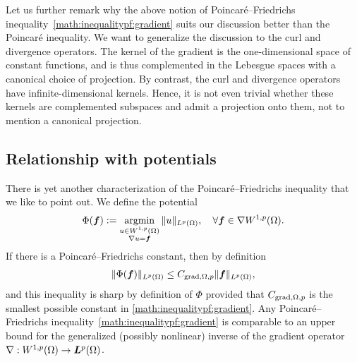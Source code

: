 \documentclass[10pt,a4paper]{article}
\begin{document}
\begin{remark}
    Let us further remark why the above notion of Poincar\'e--Friedrichs inequality~\eqref{math:inequalitypf:gradient} suits our discussion better than the Poincar\'e inequality. 
    We want to generalize the discussion to the curl and divergence operators. 
    The kernel of the gradient is the one-dimensional space of constant functions, and is thus complemented in the Lebesgue spaces with a canonical choice of projection. 
    By contrast, the curl and divergence operators have infinite-dimensional kernels. 
    Hence, it is not even trivial whether these kernels are complemented subspaces and admit a projection onto them, not to mention a canonical projection. 
\end{remark}





\subsection{Relationship with potentials}

There is yet another characterization of the Poincar\'e--Friedrichs inequality that we like to point out. 
We define the potential 
\begin{align*}
    \Phi( \bm{f} ) := \operatorname*{{\rm argmin}}\limits_{ \substack{ u \in W^{1,p}(\Omega) \\ \nabla u = \bm{f} } } \| u \|_{L^{p}(\Omega)},
    \quad 
    \forall 
    \bm{f} \in \nabla W^{1,p}(\Omega)
    .
\end{align*}
If there is a Poincar\'e--Friedrichs constant, then by definition
\begin{align*}
    \| \Phi(\bm{f}) \|_{L^{p}(\Omega)} \leq C_{\operatorname{grad},\Omega,p} \| \bm{f} \|_{L^{p}(\Omega)},
\end{align*}
and this inequality is sharp by definition of $\Phi$ provided that $C_{\operatorname{grad},\Omega,p}$ is the smallest possible constant in \eqref{math:inequalitypf:gradient}. 
Any Poincar\'e--Friedrichs inequality~\eqref{math:inequalitypf:gradient} is comparable to an upper bound for the generalized (possibly nonlinear) inverse of the gradient operator $\nabla : W^{1,p}(\Omega) \rightarrow \bm{L}^{p}(\Omega)$. 
\end{document}
